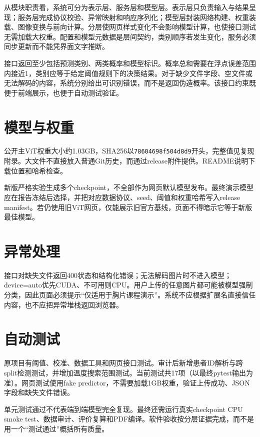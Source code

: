 从模块职责看，系统可分为表示层、服务层和模型层。表示层只负责输入与结果呈现；服务层完成协议校验、异常映射和响应序列化；模型层封装网络构建、权重装载、图像变换与前向计算。分层使网页样式变化不会影响模型计算，也使接口测试无需加载大权重。配置和模型元数据是层间契约，类别顺序若发生变化，服务必须同步更新而不能凭界面文字推断。

接口返回至少包括预测类别、两类概率和模型标识。概率总和需要在浮点误差范围内接近1，类别应等于给定阈值规则下的决策结果。对于缺少文件字段、空文件或无法解码的内容，系统分别给出可识别错误，而不是返回伪造概率。该接口约束既便于前端展示，也便于自动测试验证。

\section{模型与权重}

公开主ViT权重大小约1.03GB，SHA256以\texttt{78604698f504d8d9}开头，完整值见复现附录。大文件不直接放入普通Git历史，而通过release附件提供。README说明下载位置和哈希检查。

新版严格实验生成多个checkpoint，不全部作为网页默认模型发布。最终演示模型应在报告冻结后选择，并把对应数据协议、seed、阈值和权重哈希写入release manifest。若仍使用旧ViT网页，仅能展示旧官方基线，页面不得暗示它等于新版最佳模型。

\section{异常处理}

接口对缺失文件返回400状态和结构化错误；无法解码图片时不进入模型；device=auto优先CUDA、不可用则CPU。用户上传的任意图片都可能被模型强制分类，因此页面必须提示“仅适用于胸片课程演示”。系统不应根据扩展名直接信任内容，也不应把异常堆栈返回浏览器。

\section{自动测试}

原项目有阈值、校准、数据工具和网页接口测试。审计后新增患者ID解析与跨split检测测试，并增加温度搜索范围测试。当前测试共17项（以最终pytest输出为准）。网页测试使用fake predictor，不需要加载1GB权重，验证上传成功、JSON字段和缺失文件错误。

单元测试通过不代表端到端模型完全复现。最终还需运行真实checkpoint CPU smoke test、数据审计、评价复算和PDF编译。软件验收按分层证据完成，而不是用一个“测试通过”概括所有质量。

